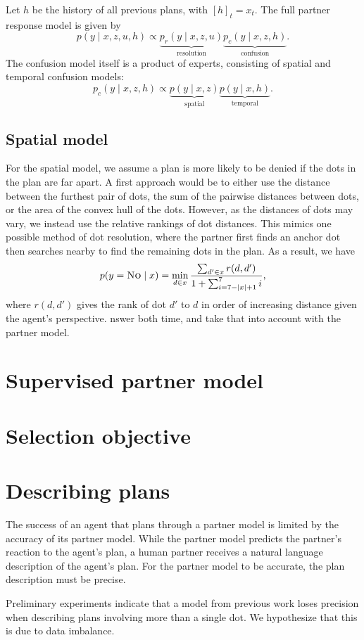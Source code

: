 \documentclass[11pt]{article}
\newcommand{\justin}[1]{{{\textcolor{purple}{(Justin: #1)}}}}
\begin{document}
Let $h$ be the history of all previous plans,
with $[h]_t = x_t$.
The full partner response model is given by
$$
p(y \mid x, z, u, h)
\propto \underbrace{p_r(y \mid x,z,u)}_{\text{resolution}}
\underbrace{p_c(y \mid x,z,h)}_{\text{confusion}}.
$$
The confusion model itself is a product of experts,
consisting of spatial and temporal confusion models:
$$
p_c(y\mid x,z,h) \propto
\underbrace{p(y \mid x,z)}_{\text{spatial}}
\underbrace{p(y \mid x,h)}_{\text{temporal}}.
$$

\subsection{Spatial model}
For the spatial model, we assume a plan is more likely to be denied if the dots in the plan are far apart.
A first approach would be to either use the distance between the furthest pair of dots, the sum of the pairwise distances between dots, or the area of the convex hull of the dots.
However, as the distances of dots may vary,
we instead use the relative rankings of dot distances.
This mimics one possible method of dot resolution, where the partner first finds an anchor dot then searches nearby to find the remaining dots in the plan.
As a result, we have
$$
p(y = \textsc{No} \mid x)
= \min_{d\in x} \frac{
\sum_{d'\in x} r(d,d')
}{
1+\sum_{i=7-|x|+1}^7 i
},
$$
where $r(d,d')$ gives the rank of dot $d'$ to $d$ in order of increasing distance given the agent's perspective.
nswer both time, and take that into account with the partner model.

\section{Supervised partner model}


\section{Selection objective}

\section{Describing plans}
The success of an agent that plans through a partner model is limited
by the accuracy of its partner model.
While the partner model predicts the partner's reaction to the agent's plan,
a human partner receives a natural language description of the agent's plan.
For the partner model to be accurate, the plan description must be precise.

Preliminary experiments indicate that a model from previous work \citep{fried}
loses precision when describing plans involving more than a single dot.
We hypothesize that this is due to data imbalance.
\end{document}
